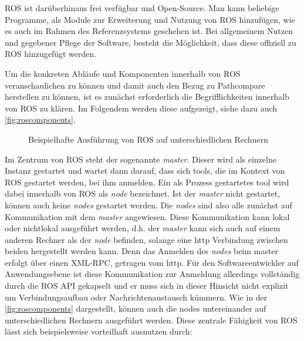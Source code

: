 
ROS ist darüberhinaus frei verfügbar und Open-Source. Man kann beliebige
Programme, als Module zur Erweiterung und Nutzung von ROS hinzufügen, wie
es auch im Rahmen des Referenzsystems geschehen ist. Bei allgemeinem Nutzen und
gegebener Pflege der Software, besteht die Möglichkeit, dass diese offiziell zu
ROS hinzugefügt werden.

Um die konkreten Abläufe und Komponenten innerhalb von ROS
veranschaulichen zu können und damit auch den Bezug zu Pathcompare herstellen
zu können, ist es zunächst erforderlich die Begrifflichkeiten innerhalb von
ROS zu klären. Im Folgendem werden diese aufgezeigt, siehe dazu auch
\autoref{fig:roscomponents}.

\begin{figure}[t]
  \begin{center}
  \end{center}
  \caption{Beispielhafte Ausführung von ROS auf unterschiedlichen Rechnern}
  \label{fig:roscomponents}
\end{figure}

Im Zentrum von ROS steht der sogenannte \textit{master}. Dieser wird als
einzelne Instanz gestartet und wartet dann darauf, dass sich tools, die im
Kontext von ROS gestartet werden, bei ihm anmelden. Ein als Prozess gestartetes
tool wird dabei innerhalb von ROS als \textit{node} bezeichnet. Ist der
\textit{master} nicht gestartet, können auch keine \textit{nodes} gestartet
werden. Die \textit{nodes} sind also alle zunächst auf Kommunikation mit dem
\textit{master} angewiesen. Diese Kommunikation kann lokal oder nichtlokal
ausgeführt werden, d.h. der \textit{master} kann sich auch auf einem anderen
Rechner als der \textit{node} befinden, solange eine http Verbindung zwischen
beiden hergestellt werden kann. Denn das Anmelden des \textit{nodes} beim
master erfolgt über einen \gls{XML-RPC}, getragen vom http. Für den 
Softwareentwickler auf Anwendungsebene ist diese Kommunikation zur Anmeldung
allerdings
vollständig durch die ROS API gekapselt und er muss sich in dieser Hinsicht
nicht explizit um Verbindungsaufbau oder Nachrichtenaustausch kümmern. Wie in
der \autoref{fig:roscomponents} dargestellt, können auch die nodes
untereinander auf unterschiedlichen Rechnern ausgeführt werden. Diese zentrale
Fähigkeit von ROS lässt sich beispielsweise vorteilhaft ausnutzen durch:

